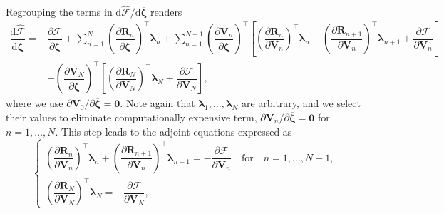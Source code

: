 \documentclass[preprint,11pt]{elsarticle}
\theoremstyle{definition}
\begin{document}
Regrouping the terms in $\text{d} \widehat{\mathcal{F}}/\text{d} \overline{\boldsymbol{\zeta}}$ renders
\begin{equation} \label{Regrouping Terms for Sensitivity}
    \begin{array}{ll}
        \dfrac{\text{d} \widehat{\mathcal{F}}}{\text{d} \overline{\boldsymbol{\zeta}}}
        = &\displaystyle \dfrac{\partial \mathcal{F}}{\partial \overline{\boldsymbol{\zeta}}}
        + \sum_{n=1}^N \left( \dfrac{\partial \mathbf{R}_n}{\partial \overline{\boldsymbol{\zeta}}} \right)^\top \boldsymbol{\lambda}_n
        + \sum_{n=1}^{N-1} \left( \dfrac{\partial \mathbf{V}_n}{\partial \overline{\boldsymbol{\zeta}}} \right)^\top 
        \left[ \left( \dfrac{\partial \mathbf{R}_n}{\partial \mathbf{V}_n} \right)^\top \boldsymbol{\lambda}_n
        + \left( \dfrac{\partial \mathbf{R}_{n+1}}{\partial \mathbf{V}_n} \right)^\top \boldsymbol{\lambda}_{n+1}
        + \dfrac{\partial \mathcal{F}}{\partial \mathbf{V}_n} \right] \\[15pt]
        &+ \displaystyle \left( \dfrac{\partial \mathbf{V}_N}{\partial \overline{\boldsymbol{\zeta}}} \right)^\top
        \left[ \left( \dfrac{\partial \mathbf{R}_N}{\partial \mathbf{V}_N} \right)^\top \boldsymbol{\lambda}_N + \dfrac{\partial \mathcal{F}}{\partial \mathbf{V}_N} \right],
    \end{array}
\end{equation}
where we use $\partial \mathbf{V}_0/\partial \overline{\boldsymbol{\zeta}} = \mathbf{0}$. Note again that $\boldsymbol{\lambda}_1, \ldots, \boldsymbol{\lambda}_N$ are arbitrary, and we select their values to eliminate computationally expensive term, $\partial \mathbf{V}_n/\partial \overline{\boldsymbol{\zeta}} = \mathbf{0}$ for $n = 1,\ldots,N$. This step leads to the adjoint equations expressed as
\begin{equation} \label{Adjoint Equations}
    \left\{ \begin{array}{l}
        \left( \dfrac{\partial \mathbf{R}_n}{\partial \mathbf{V}_n} \right)^\top \boldsymbol{\lambda}_n
        + \left( \dfrac{\partial \mathbf{R}_{n+1}}{\partial \mathbf{V}_n} \right)^\top \boldsymbol{\lambda}_{n+1}
        = - \dfrac{\partial \mathcal{F}}{\partial \mathbf{V}_n} \quad \text{for} \quad n = 1,\ldots,N-1, \\[12pt]
        
        \left( \dfrac{\partial \mathbf{R}_N}{\partial \mathbf{V}_N} \right)^\top \boldsymbol{\lambda}_N = - \dfrac{\partial \mathcal{F}}{\partial \mathbf{V}_N},
    \end{array} \right.
\end{equation}
\end{document}
